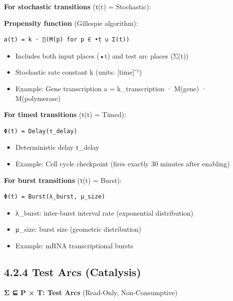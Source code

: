 \textbf{For stochastic transitions} (τ(t) = Stochastic):

\textbf{Propensity function} (Gillespie algorithm):

\begin{lstlisting}
a(t) = k · ∏(M(p) for p ∈ •t ∪ Σ(t))
\end{lstlisting}

\begin{itemize}
\tightlist
\item
  Includes both input places (•t) and test arc places (Σ(t))
\item
  Stochastic rate constant k (units: {[}time{]}⁻¹)
\item
  Example: Gene transcription a = k\_transcription · M(gene) ·
  M(polymerase)
\end{itemize}

\textbf{For timed transitions} (τ(t) = Timed):

\begin{lstlisting}
Φ(t) = Delay(τ_delay)
\end{lstlisting}

\begin{itemize}
\tightlist
\item
  Deterministic delay τ\_delay
\item
  Example: Cell cycle checkpoint (fires exactly 30 minutes after
  enabling)
\end{itemize}

\textbf{For burst transitions} (τ(t) = Burst):

\begin{lstlisting}
Φ(t) = Burst(λ_burst, μ_size)
\end{lstlisting}

\begin{itemize}
\tightlist
\item
  λ\_burst: inter-burst interval rate (exponential distribution)
\item
  μ\_size: burst size (geometric distribution)
\item
  Example: mRNA transcriptional bursts
\end{itemize}

\hypertarget{test-arcs-catalysis}{%
\subsection{4.2.4 Test Arcs (Catalysis)}\label{test-arcs-catalysis}}

\textbf{Σ ⊆ P × T: Test Arcs} (Read-Only, Non-Consumptive)

